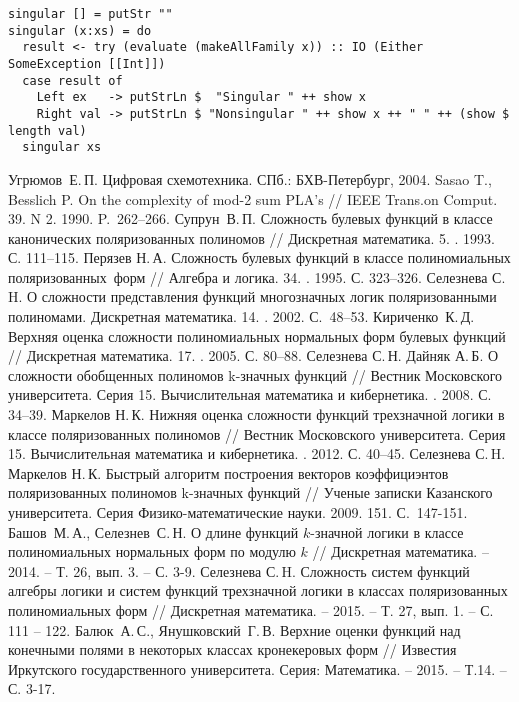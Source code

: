 \documentclass[bibliography=totoc, a4paper, 14pt]{extarticle}
\begin{document}
\begin{footnotesize}
\begin{verbatim}
singular [] = putStr ""
singular (x:xs) = do
  result <- try (evaluate (makeAllFamily x)) :: IO (Either SomeException [[Int]])
  case result of
    Left ex   -> putStrLn $  "Singular " ++ show x
    Right val -> putStrLn $ "Nonsingular " ++ show x ++ " " ++ (show $ length val)
  singular xs
\end{verbatim}
\end{footnotesize}

\makeatletter
\renewcommand*{\@biblabel}[1]{\hfill#1.}
\makeatother

\begin{singlespace}
\begin{thebibliography}{0}
 Угрюмов~Е.\,П. Цифровая схемотехника. СПб.: БХВ-Петербург, 2004.
 Sasao T., Besslich P. On the complexity of mod-2 sum PLA’s  // IEEE Trans.on Comput. 39. N 2. 1990. P.~262--266.
 Супрун~В.\,П. Сложность булевых функций в классе канонических поляризованных полиномов // Дискретная математика. 5.
    . 1993. С. 111--115.
 Перязев Н.\,А. Сложность булевых функций в классе полиномиальных поляризованных~форм // Алгебра и логика. 34.
    . 1995. С. 323--326.
 Селезнева С.\,H. О сложности представления функций многозначных логик поляризованными полиномами. Дискретная
    математика. 14. . 2002. С.~48--53.
 Кириченко~К.\,Д. Верхняя оценка сложности полиномиальных нормальных форм булевых функций
    // Дискретная математика. 17. . 2005. С. 80--88.
 Селезнева С.\,Н. Дайняк А.\,Б. О сложности обобщенных полиномов k\nobreakdash-значных функций // Вестник Московского
    университета. Серия 15. Вычислительная математика и кибернетика. . 2008. С. 34--39.
 Маркелов Н.\,К. Нижняя оценка сложности функций трехзначной логики в классе поляризованных полиномов // Вестник
    Московского университета. Серия 15. Вычислительная математика и кибернетика. . 2012. С. 40--45.
 Селезнева С.\,H. Маркелов Н.\,К. Быстрый алгоритм построения векторов коэффициэнтов поляризованных полиномов
    k-значных функций // Ученые записки Казанского университета. Серия Физико-математические науки. 2009. 151.
     С.~147-151.
 Башов~М.\,А., Селезнев~С.\,Н. О длине функций $k$-значной логики в классе полиномиальных нормальных
    форм по модулю $k$ // Дискретная математика. -- 2014. -- Т. 26, вып. 3. -- С. 3-9.
 Селезнева С.\,H. Сложность систем функций алгебры логики и систем функций трехзначной логики в классах
    поляризованных полиномиальных форм // Дискретная математика. -- 2015. -- Т. 27, вып. 1. -- С. 111 -- 122. 
 Балюк~А.\,С., Янушковский~Г.\,В. Верхние оценки функций над конечными полями в некоторых классах
    кронекеровых форм // Известия Иркутского государственного университета. Серия: Математика. -- 2015. -- Т.14. -- С. 3-17.
\end{thebibliography}

\end{singlespace}
\end{document}
